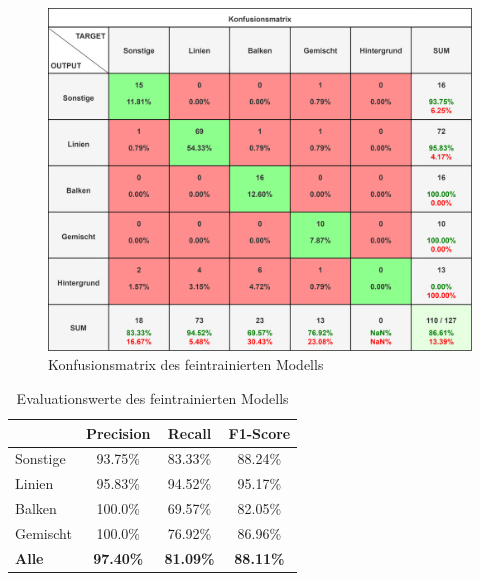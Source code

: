 \begin{figure}[H]
    \centering
    \captionsetup{width=1\linewidth}
    \includegraphics[width=1\textwidth]{Experimente/img/detect/val@0.891 20240612-093743_double/konfusionsmatrix.png}
    \caption{ Konfusionsmatrix des feintrainierten Modells}
    \label{fig:extraction_output}
\end{figure}

\begin{table}[H]
    \centering
    \begin{tabular}{|l|c|c|c|}
        \hline
        \rowcolor[HTML]{EFEFEF}
                      & Precision        & Recall           & F1-Score         \\ \hline
        Sonstige      & 93.75\%          & 83.33\%          & 88.24\%          \\ \hline
        Linien        & 95.83\%          & 94.52\%          & 95.17\%          \\ \hline
        Balken        & 100.0\%          & 69.57\%          & 82.05\%          \\ \hline
        Gemischt      & 100.0\%          & 76.92\%          & 86.96\%          \\ \hline
        \textbf{Alle} & \textbf{97.40\%} & \textbf{81.09\%} & \textbf{88.11\%} \\ \hline
    \end{tabular}
    \caption{Evaluationswerte des feintrainierten Modells}
\end{table}


